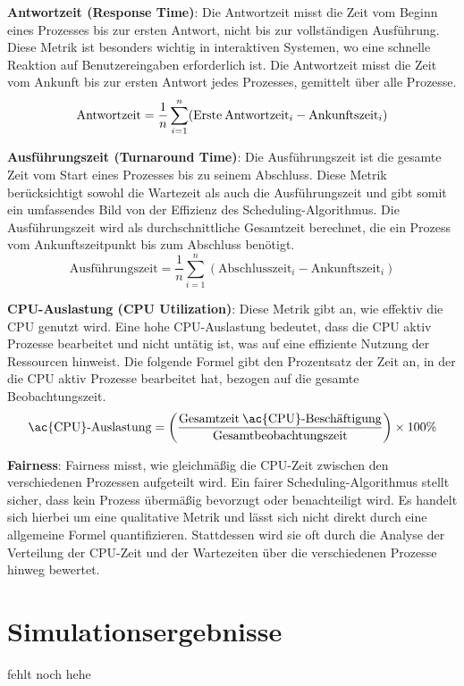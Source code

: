 \textbf{Antwortzeit (Response Time)}: Die Antwortzeit misst die Zeit vom Beginn eines Prozesses bis zur ersten Antwort, nicht bis zur vollständigen Ausführung. Diese Metrik ist besonders wichtig in interaktiven Systemen, wo eine schnelle Reaktion auf Benutzereingaben erforderlich ist. Die Antwortzeit misst die Zeit vom Ankunft bis zur ersten Antwort jedes Prozesses, gemittelt über alle Prozesse.
\[ \text{Antwortzeit} = \frac{1}{n} \sum_{i=1}^{n} (\text{Erste\:Antwortzeit}_i - \text{Ankunftszeit}_i) \]


\textbf{Ausführungszeit (Turnaround Time)}: Die Ausführungszeit ist die gesamte Zeit vom Start eines Prozesses bis zu seinem Abschluss. Diese Metrik berücksichtigt sowohl die Wartezeit als auch die Ausführungszeit und gibt somit ein umfassendes Bild von der Effizienz des Scheduling-Algorithmus. Die Ausführungszeit wird als durchschnittliche Gesamtzeit berechnet, die ein Prozess vom Ankunftszeitpunkt bis zum Abschluss benötigt.
\[ \text{Ausführungszeit} = \frac{1}{n} \sum_{i=1}^{n} (\text{Abschlusszeit}_i - \text{Ankunftszeit}_i) \]


\textbf{\ac{CPU}-Auslastung (\ac{CPU} Utilization)}: Diese Metrik gibt an, wie effektiv die \ac{CPU} genutzt wird. Eine hohe \ac{CPU}-Auslastung bedeutet, dass die \ac{CPU} aktiv Prozesse bearbeitet und nicht untätig ist, was auf eine effiziente Nutzung der Ressourcen hinweist. Die folgende Formel gibt den Prozentsatz der Zeit an, in der die CPU aktiv Prozesse bearbeitet hat, bezogen auf die gesamte Beobachtungszeit.
\[ \text{\ac{CPU}-Auslastung} = \left( \frac{\text{Gesamtzeit\:\ac{CPU}-Beschäftigung}}{\text{Gesamtbeobachtungszeit}} \right) \times 100\% \]


\textbf{Fairness}: Fairness misst, wie gleichmäßig die \ac{CPU}-Zeit zwischen den verschiedenen Prozessen aufgeteilt wird. Ein fairer Scheduling-Algorithmus stellt sicher, dass kein Prozess übermäßig bevorzugt oder benachteiligt wird. Es handelt sich hierbei um eine qualitative Metrik und lässt sich nicht direkt durch eine allgemeine Formel quantifizieren. Stattdessen wird sie oft durch die Analyse der Verteilung der \ac{CPU}-Zeit und der Wartezeiten über die verschiedenen Prozesse hinweg bewertet.


\section{Simulationsergebnisse}
fehlt noch hehe

